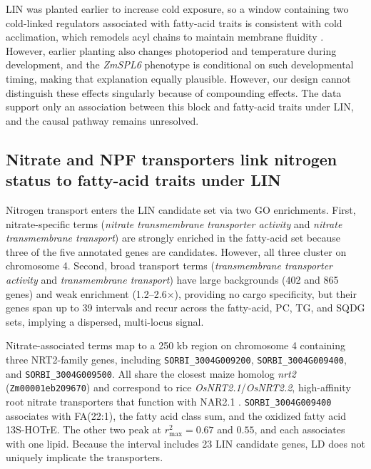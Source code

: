 \documentclass[9pt,twocolumn,twoside]{rilabRxiv}
\begin{document}
LIN was planted earlier to increase cold exposure, so a window containing two cold-linked regulators associated with fatty-acid traits is consistent with cold acclimation, which remodels acyl chains to maintain membrane fluidity \citep{Tan2018, Zhang2020}. However, earlier planting also changes photoperiod and temperature during development, and the \textit{ZmSPL6} phenotype is conditional on such developmental timing, making that explanation equally plausible. However, our design cannot distinguish these effects singularly because of compounding effects. The data support only an association between this block and fatty-acid traits under LIN, and the causal pathway remains unresolved.

\subsection*{Nitrate and NPF transporters link nitrogen status to fatty-acid traits under LIN}

Nitrogen transport enters the LIN candidate set via two GO enrichments. First, nitrate-specific terms (\textit{nitrate transmembrane transporter activity} and \textit{nitrate transmembrane transport}) are strongly enriched in the fatty-acid set because three of the five annotated genes are candidates. However, all three cluster on chromosome 4. Second, broad transport terms (\textit{transmembrane transporter activity} and \textit{transmembrane transport}) have large backgrounds (402 and 865 genes) and weak enrichment (1.2–2.6$\times$), providing no cargo specificity, but their genes span up to 39 intervals and recur across the fatty-acid, PC, TG, and SQDG sets, implying a dispersed, multi-locus signal.

Nitrate-associated terms map to a 250 kb region on chromosome 4 containing three NRT2-family genes, including \texttt{SORBI\_3004G009200}, \texttt{SORBI\_3004G009400}, and \texttt{SORBI\_3004G009500}. All share the closest maize homolog \textit{nrt2} (\texttt{Zm00001eb209670}) and correspond to rice \textit{OsNRT2.1}/\textit{OsNRT2.2}, high-affinity root nitrate transporters that function with NAR2.1 \citep{Yan2011OsNAR21, Lupini2016NAR2}. \texttt{SORBI\_3004G009400} associates with FA(22:1), the fatty acid class sum, and the oxidized fatty acid 13S-HOTrE. The other two peak at $r^2_{\max}=0.67$ and $0.55$, and each associates with one lipid. Because the interval includes 23 LIN candidate genes, LD does not uniquely implicate the transporters.
\end{document}
